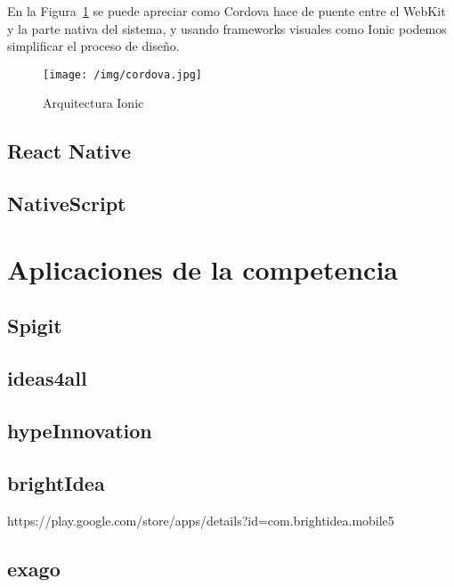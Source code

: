 En la Figura~\ref{fig:CORDOVAimg} se puede apreciar como Cordova hace de puente entre el WebKit y la parte nativa del sistema, y usando 
frameworks visuales como Ionic podemos simplificar el proceso de diseño.

\begin{figure}[!h]
	\begin{center}
		\texttt{[image: /img/cordova.jpg]}
		\caption{Arquitectura Ionic~\cite{CORDOVAimg}}
		\label{fig:CORDOVAimg}
	\end{center}
\end{figure}



\subsection{React Native}



\subsection{NativeScript}

\section{Aplicaciones de la competencia}
\subsection{Spigit}
\subsection{ideas4all}
\subsection{hypeInnovation}
\subsection{brightIdea}
https://play.google.com/store/apps/details?id=com.brightidea.mobile5
\subsection{exago}

